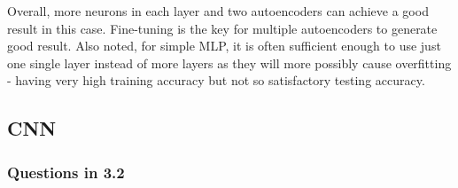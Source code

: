 \documentclass{article}
\begin{document}
Overall, more neurons in each layer and two autoencoders can achieve a good result in this case. Fine-tuning is the key for multiple autoencoders to generate good result. Also noted, for simple MLP, it is often sufficient enough to use just one single layer instead of more layers as they will more possibly cause overfitting - having very high training accuracy but not so satisfactory testing accuracy.

\subsection{CNN}

\subsubsection{Questions in 3.2}
\end{document}
